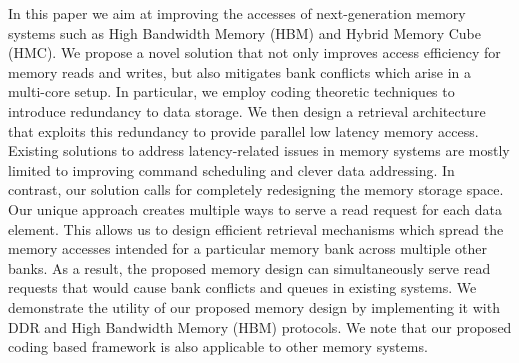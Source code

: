 In this paper we aim at improving the accesses of next-generation memory systems such as High Bandwidth Memory (HBM) and Hybrid Memory Cube (HMC). We propose a novel solution that not only improves access efficiency for memory reads and writes, but also mitigates bank conflicts which arise in a multi-core setup. In particular, we employ coding theoretic techniques to introduce redundancy to data storage. We then design a retrieval architecture that exploits this redundancy to provide parallel low latency memory access. Existing solutions to address latency-related issues in memory systems are mostly limited to improving command scheduling and clever data addressing. In contrast, our solution calls for completely redesigning the memory storage space. Our unique approach creates multiple ways to serve a read request for each data element. This allows us to design efficient retrieval mechanisms which spread the memory accesses intended for a particular memory bank across multiple other banks. As a result, the proposed memory design can simultaneously serve read requests that would cause bank conflicts and queues in existing systems. We demonstrate the utility of our proposed memory design by implementing it with DDR and High Bandwidth Memory (HBM) protocols. We note that our proposed coding based framework is also applicable to other memory systems.



